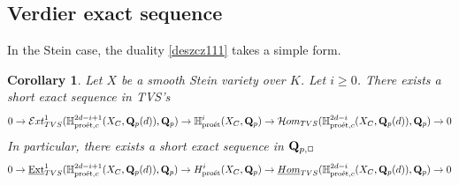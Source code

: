 \documentclass[10pt,reqno]{amsart}
\newtheorem{corollary}[equation]{Corollary}
\theoremstyle{definition}
\theoremstyle{remark}
\newcommand{\proeet}{\operatorname{pro\acute{e}t} }
\newcommand{\uHom}{\underline{{\rm{Hom}} }}
\newcommand{\Ext}{\operatorname{Ext} }
\numberwithin{equation}{section}
\def\Q{{\bf Q}} \def\Z{{\bf Z}}
\numberwithin{equation}{section}
\begin{document}
\subsection{Verdier exact sequence} In the Stein case, the duality \eqref{deszcz111} takes a simple form. 
\begin{corollary} \label{rainy-day} Let $X$ be a smooth Stein variety over $K$. Let $i\geq 0$. 
There exists a short exact sequence in {\rm TVS}'s
$$
0\to {\mathcal Ext}^1_{\rm TVS}({\mathbb H}^{2d-i+1}_{\proeet,c}(X_C,\Q_p(d)),\Q_p)\to {\mathbb H}^i_{\proeet}(X_C,\Q_p)\to{\mathcal Hom}_{\rm TVS}({\mathbb H}^{2d-i}_{\proeet,c}(X_C,\Q_p(d)),\Q_p)\to 0
$$
In particular, there exists a short exact sequence in $\Q_{p,\Box}$
$$
0\to\underline{\Ext}^1_{\rm TVS}({\mathbb H}^{2d-i+1}_{\proeet,c}(X_C,\Q_p(d)),\Q_p)\to {H}^i_{\proeet}(X_C,\Q_p)\to\uHom_{\rm TVS}({\mathbb H}^{2d-i}_{\proeet,c}(X_C,\Q_p(d)),\Q_p)\to 0
$$
\end{corollary}
\end{document}

